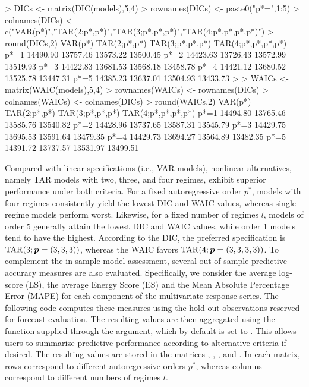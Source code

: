 \begin{example}
> DICs <- matrix(DIC(models),5,4)
> rownames(DICs) <- paste0("p*=",1:5)
> colnames(DICs) <- c("VAR(p*)","TAR(2;p*,p*)","TAR(3;p*,p*,p*)","TAR(4;p*,p*,p*,p*)")
> round(DICs,2)
      VAR(p*) TAR(2;p*,p*) TAR(3;p*,p*,p*) TAR(4;p*,p*,p*,p*)
p*=1 14490.90     13757.46        13573.22           13500.45
p*=2 14423.63     13726.43        13572.99           13519.93
p*=3 14422.83     13681.53        13568.18           13458.78
p*=4 14421.12     13680.52        13525.78           13447.31
p*=5 14385.23     13637.01        13504.93           13433.73
>
> WAICs <- matrix(WAIC(models),5,4)
> rownames(WAICs) <- rownames(DICs)
> colnames(WAICs) <- colnames(DICs)
> round(WAICs,2)
      VAR(p*) TAR(2;p*,p*) TAR(3;p*,p*,p*) TAR(4;p*,p*,p*,p*)
p*=1 14494.80     13765.46        13585.76           13540.82
p*=2 14428.96     13737.65        13587.31           13545.79
p*=3 14429.75     13695.53        13591.64           13479.35
p*=4 14429.73     13694.27        13564.89           13482.35
p*=5 14391.72     13737.57        13531.97           13499.51
\end{example}
Compared with linear specifications (i.e., VAR models), nonlinear alternatives, namely TAR models with two, three, and four regimes, exhibit superior performance under both criteria. For a fixed autoregressive order $p^*$, models with four regimes consistently yield the lowest DIC and WAIC values, whereas single-regime models perform worst. Likewise, for a fixed number of regimes $l$, models of order 5 generally attain the lowest DIC and WAIC values, while order 1 models tend to have the highest. According to the DIC, the preferred specification is ${\rm TAR}(3;\bm{p}=(3,3,3))$, whereas the WAIC favors ${\rm TAR}(4;\bm{p}=(3,3,3,3))$. To complement the in-sample model assessment, several out-of-sample predictive accuracy measures are also evaluated. Specifically, we consider the average log-score (LS), the average Energy Score (ES) and the Mean Absolute Percentage Error (MAPE) for each component of the multivariate response series. The following code computes these measures using the hold-out observations reserved for forecast evaluation. The resulting values are then aggregated using the function supplied through the  argument, which by default is set to . This allows users to summarize predictive performance according to alternative criteria if desired. The resulting values are stored in the matrices , , , and . In each matrix, rows correspond to different autoregressive orders $p^*$, whereas columns correspond to different numbers of regimes $l$.

